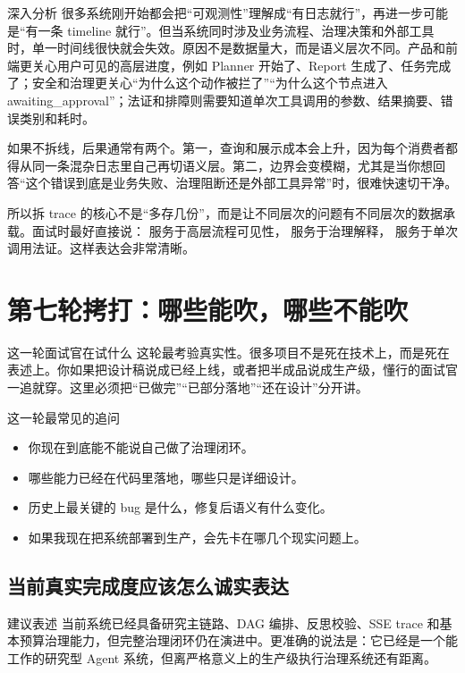 \documentclass[12pt]{article}
\begin{document}
\begin{analysisBox}{深入分析}
很多系统刚开始都会把“可观测性”理解成“有日志就行”，再进一步可能是“有一条 timeline 就行”。但当系统同时涉及业务流程、治理决策和外部工具时，单一时间线很快就会失效。原因不是数据量大，而是语义层次不同。产品和前端更关心用户可见的高层进度，例如 Planner 开始了、Report 生成了、任务完成了；安全和治理更关心“为什么这个动作被拦了”“为什么这个节点进入 awaiting\_approval”；法证和排障则需要知道单次工具调用的参数、结果摘要、错误类别和耗时。

如果不拆线，后果通常有两个。第一，查询和展示成本会上升，因为每个消费者都得从同一条混杂日志里自己再切语义层。第二，边界会变模糊，尤其是当你想回答“这个错误到底是业务失败、治理阻断还是外部工具异常”时，很难快速切干净。

所以拆 trace 的核心不是“多存几份”，而是让不同层次的问题有不同层次的数据承载。面试时最好直接说： 服务于高层流程可见性， 服务于治理解释， 服务于单次调用法证。这样表达会非常清晰。
\end{analysisBox}

\section{第七轮拷打：哪些能吹，哪些不能吹}

\begin{summaryBox}{这一轮面试官在试什么}
这轮最考验真实性。很多项目不是死在技术上，而是死在表述上。你如果把设计稿说成已经上线，或者把半成品说成生产级，懂行的面试官一追就穿。这里必须把“已做完”“已部分落地”“还在设计”分开讲。
\end{summaryBox}

\begin{qaBox}{这一轮最常见的追问}
\begin{itemize}[leftmargin=2em]
  \item 你现在到底能不能说自己做了治理闭环。
  \item 哪些能力已经在代码里落地，哪些只是详细设计。
  \item 历史上最关键的 bug 是什么，修复后语义有什么变化。
  \item 如果我现在把系统部署到生产，会先卡在哪几个现实问题上。
\end{itemize}
\end{qaBox}

\subsection{当前真实完成度应该怎么诚实表达}
\begin{riskBox}{建议表述}
当前系统已经具备研究主链路、DAG 编排、反思校验、SSE trace 和基本预算治理能力，但完整治理闭环仍在演进中。更准确的说法是：它已经是一个能工作的研究型 Agent 系统，但离严格意义上的生产级执行治理系统还有距离。
\end{riskBox}
\end{document}
